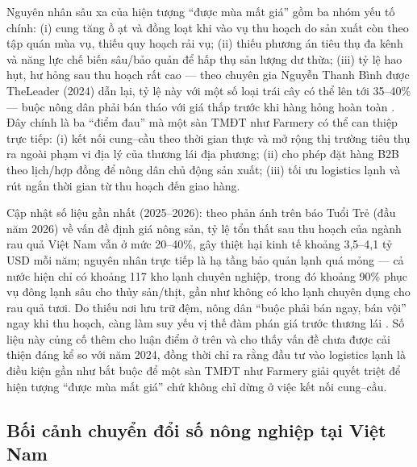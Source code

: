 Nguyên nhân sâu xa của hiện tượng ``được mùa mất giá'' gồm ba nhóm yếu tố chính: (i) cung tăng ồ ạt và đồng loạt khi vào vụ thu hoạch do sản xuất còn theo tập quán mùa vụ, thiếu quy hoạch rải vụ; (ii) thiếu phương án tiêu thụ đa kênh và năng lực chế biến sâu/bảo quản để hấp thụ sản lượng dư thừa; (iii) tỷ lệ hao hụt, hư hỏng sau thu hoạch rất cao --- theo chuyên gia Nguyễn Thanh Bình được TheLeader (2024) dẫn lại, tỷ lệ này với một số loại trái cây có thể lên tới 35--40\% --- buộc nông dân phải bán tháo với giá thấp trước khi hàng hỏng hoàn toàn \cite{theleader_2024}. Đây chính là ba ``điểm đau'' mà một sàn TMĐT như Farmery có thể can thiệp trực tiếp: (i) kết nối cung--cầu theo thời gian thực và mở rộng thị trường tiêu thụ ra ngoài phạm vi địa lý của thương lái địa phương; (ii) cho phép đặt hàng B2B theo lịch/hợp đồng để nông dân chủ động sản xuất; (iii) tối ưu logistics lạnh và rút ngắn thời gian từ thu hoạch đến giao hàng.

Cập nhật số liệu gần nhất (2025--2026): theo phản ánh trên báo Tuổi Trẻ (đầu năm 2026) về vấn đề định giá nông sản, tỷ lệ tổn thất sau thu hoạch của ngành rau quả Việt Nam vẫn ở mức 20--40\%, gây thiệt hại kinh tế khoảng 3,5--4,1 tỷ USD mỗi năm; nguyên nhân trực tiếp là hạ tầng bảo quản lạnh quá mỏng --- cả nước hiện chỉ có khoảng 117 kho lạnh chuyên nghiệp, trong đó khoảng 90\% phục vụ đông lạnh sâu cho thủy sản/thịt, gần như không có kho lạnh chuyên dụng cho rau quả tươi. Do thiếu nơi lưu trữ đệm, nông dân ``buộc phải bán ngay, bán vội'' ngay khi thu hoạch, càng làm suy yếu vị thế đàm phán giá trước thương lái \cite{tuoitre_2026}. Số liệu này củng cố thêm cho luận điểm ở trên và cho thấy vấn đề chưa được cải thiện đáng kể so với năm 2024, đồng thời chỉ ra rằng đầu tư vào logistics lạnh là điều kiện gần như bắt buộc để một sàn TMĐT như Farmery giải quyết triệt để hiện tượng ``được mùa mất giá'' chứ không chỉ dừng ở việc kết nối cung--cầu.

\subsection{Bối cảnh chuyển đổi số nông nghiệp tại Việt Nam}


